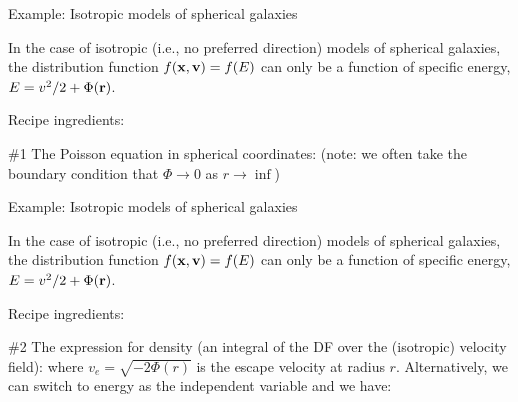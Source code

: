 \documentclass[letterpaper,landscape]{slides}
\begin{document}
\begin{slide}
\begin{center}
{\large \color{red} 
                  Example: Isotropic models of spherical galaxies  }
\end{center}

In the case of isotropic (i.e., no preferred direction) models of spherical
galaxies, the distribution function $f({\bf x}, {\bf v}) = f(E)$ can only be a
function of specific energy, $E = v^2 / 2 + \Phi({\bf r})$.

Recipe ingredients:

\#1 The Poisson equation in spherical coordinates:
(note: we often take the boundary condition that $\Phi \rightarrow 0$ as $r \rightarrow \inf$)

\vfill
\end{slide}

\begin{slide}
\begin{center}
{\large \color{red} 
                  Example: Isotropic models of spherical galaxies  }
\end{center}

In the case of isotropic (i.e., no preferred direction) models of spherical
galaxies, the distribution function $f({\bf x}, {\bf v}) = f(E)$ can only be a
function of specific energy, $E = v^2 / 2 + \Phi({\bf r})$.

Recipe ingredients:

\#2 The expression for density (an integral of the DF over the (isotropic) velocity field):
where $v_e = \sqrt{-2\Phi(r)}$ is the escape velocity at radius $r$. Alternatively, we can 
switch to energy as the independent variable and we have:

\vfill
\end{slide}
\end{document}
